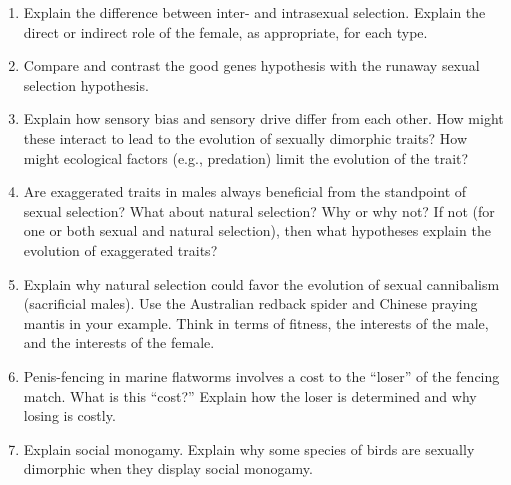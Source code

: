 \documentclass[letterpaper]{tufte-handout}
\begin{document}
\begin{enumerate}
	\item Explain the difference between inter- and intrasexual selection.  Explain the direct or indirect role of the female, as appropriate, for each type.

	\item Compare and contrast the good genes hypothesis with the runaway sexual selection hypothesis.  


	\item Explain how sensory bias and sensory drive differ from each other.  How might these interact to lead to the evolution of sexually dimorphic traits?  How might ecological factors (e.g., predation) limit the evolution of the trait?

	\item Are exaggerated traits in males always beneficial from the standpoint of sexual selection?  What about natural selection?  Why or why not?  If not (for one or both sexual and natural selection), then what hypotheses explain the evolution of exaggerated traits?

	\item Explain why natural selection could favor the evolution of sexual cannibalism (sacrificial males).  Use the Australian redback spider and Chinese praying mantis in your example.  Think in terms of fitness, the interests of the male, and the interests of the female.

	\item Penis-fencing in marine flatworms involves a cost to the ``loser'' of the fencing match. What is this ``cost?''  Explain how the loser is determined and why losing is costly.  

	\item Explain social monogamy. Explain why some species of birds are sexually dimorphic when they display social monogamy.

\end{enumerate}
\end{document}
